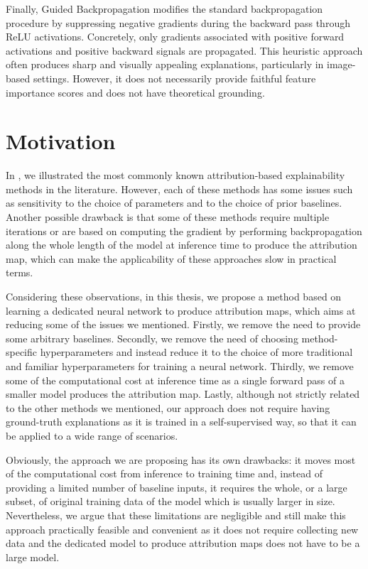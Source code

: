 Finally, Guided Backpropagation \cite{guided_backprop} modifies the standard backpropagation procedure by suppressing negative gradients during the backward pass through ReLU activations. Concretely, only gradients associated with positive forward activations and positive backward signals are propagated. This heuristic approach often produces sharp and visually appealing explanations, particularly in image-based settings. However, it does not necessarily provide faithful feature importance scores and does not have theoretical grounding.


\section{Motivation}

In , we illustrated the most commonly known attribution-based explainability methods in the literature. However, each of these methods has some issues such as sensitivity to the choice of parameters and to the choice of prior baselines. Another possible drawback is that some of these methods require multiple iterations or are based on computing the gradient by performing backpropagation along the whole length of the model at inference time to produce the attribution map, which can make the applicability of these approaches slow in practical terms.

Considering these observations, in this thesis, we propose a method based on learning a dedicated neural network to produce attribution maps, which aims at reducing some of the issues we mentioned. Firstly, we remove the need to provide some arbitrary baselines. Secondly, we remove the need of choosing method-specific hyperparameters and instead reduce it to the choice of more traditional and familiar hyperparameters for training a neural network. Thirdly, we remove some of the computational cost at inference time as a single forward pass of a smaller model produces the attribution map. Lastly, although not strictly related to the other methods we mentioned, our approach does not require having ground-truth explanations as it is trained in a self-supervised way, so that it can be applied to a wide range of scenarios. 

Obviously, the approach we are proposing has its own drawbacks: it moves most of the computational cost from inference to training time and, instead of providing a limited number of baseline inputs, it requires the whole, or a large subset, of original training data of the model which is usually larger in size. Nevertheless, we argue that these limitations are negligible and still make this approach practically feasible and convenient as it does not require collecting new data and the dedicated model to produce attribution maps does not have to be a large model.



